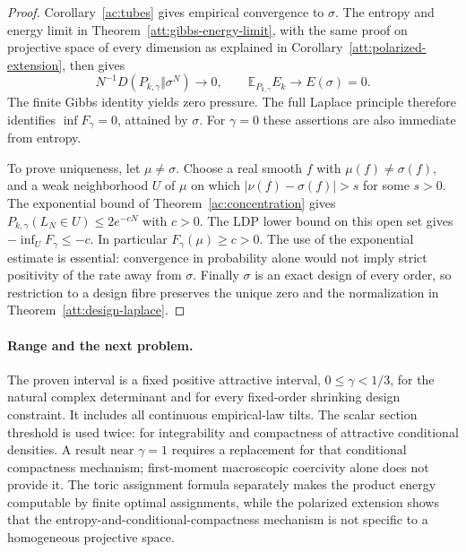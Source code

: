 \begin{proof}
Corollary~\ref{ac:tubes} gives empirical convergence to $\sigma$.
The entropy and energy limit in Theorem~\ref{att:gibbs-energy-limit},
with the same proof on projective space of every dimension as explained
in Corollary~\ref{att:polarized-extension}, then gives
\[
 N^{-1}D(P_{k,\gamma}\Vert\sigma^N)\longrightarrow0,
 \qquad \mathbb E_{P_{k,\gamma}}E_k\longrightarrow E(\sigma)=0.
\]
The finite Gibbs identity yields zero pressure. The full Laplace principle
therefore identifies $\inf F_\gamma=0$, attained by $\sigma$.
For $\gamma=0$ these assertions are also immediate from entropy.

To prove uniqueness, let $\mu\ne\sigma$. Choose a real smooth $f$
with $\mu(f)\ne\sigma(f)$, and a weak neighborhood $U$ of $\mu$
on which $|\nu(f)-\sigma(f)|>s$ for some $s>0$. The exponential
bound of Theorem~\ref{ac:concentration} gives
$P_{k,\gamma}(L_N\in U)\le2e^{-cN}$ with $c>0$.
The LDP lower bound on this open set gives
$-\inf_U F_\gamma\le-c$. In particular $F_\gamma(\mu)\ge c>0$.
The use of the exponential estimate is essential: convergence in
probability alone would not imply strict positivity of the rate away
from $\sigma$. Finally $\sigma$ is an exact design of every order,
so restriction to a design fibre preserves the unique zero and the
normalization in Theorem~\ref{att:design-laplace}.
\end{proof}

\paragraph{Range and the next problem.}
The proven interval is a fixed positive attractive interval,
$0\le\gamma<1/3$, for the natural complex determinant and for every
fixed-order shrinking design constraint. It includes all continuous
empirical-law tilts. The scalar section threshold is used twice:
for integrability and compactness of attractive conditional densities.
A result near $\gamma=1$ requires a replacement for that conditional
compactness mechanism; first-moment macroscopic coercivity alone does
not provide it. The toric assignment formula separately makes the product energy
computable by finite optimal assignments, while the polarized extension
shows that the entropy-and-conditional-compactness mechanism is not
specific to a homogeneous projective space.
